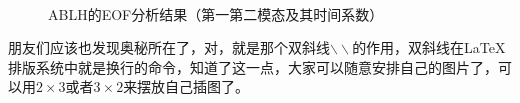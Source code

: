 \begin{figure}[htbp]

\center
{}
\\
\caption{ABLH的EOF分析结果（第一第二模态及其时间系数）}\label{fig:eof_12}
\end{figure}
朋友们应该也发现奥秘所在了，对，就是那个双斜线$ \backslash\backslash$的作用，双斜线在\LaTeX 排版系统中就是换行的命令，知道了这一点，大家可以随意安排自己的图片了，可以用$2\times 3$或者$3\times 2$来摆放自己插图了。


